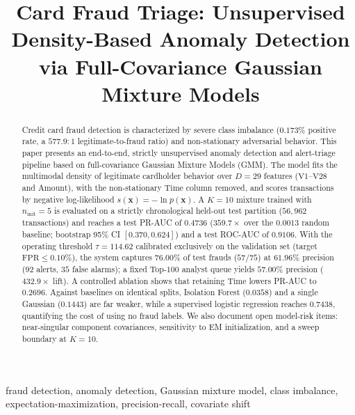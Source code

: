 \documentclass[conference]{IEEEtran}
\begin{document}
\title{Card Fraud Triage: Unsupervised Density-Based Anomaly Detection via Full-Covariance Gaussian Mixture Models}

\author{
}

\maketitle

\begin{abstract}
Credit card fraud detection is characterized by severe class imbalance ($0.173\%$ positive rate, a $577.9:1$ legitimate-to-fraud ratio) and non-stationary adversarial behavior. This paper presents an end-to-end, strictly unsupervised anomaly detection and alert-triage pipeline based on full-covariance Gaussian Mixture Models (GMM). The model fits the multimodal density of legitimate cardholder behavior over $D = 29$ features ($\text{V1}$--$\text{V28}$ and $\text{Amount}$), with the non-stationary $\text{Time}$ column removed, and scores transactions by negative log-likelihood $s(\mathbf{x}) = -\ln p(\mathbf{x})$. A $K = 10$ mixture trained with $n_{\text{init}} = 5$ is evaluated on a strictly chronological held-out test partition ($56{,}962$ transactions) and reaches a test PR-AUC of $0.4736$ ($359.7\times$ over the $0.0013$ random baseline; bootstrap 95\% CI $[0.370, 0.624]$) and a test ROC-AUC of $0.9106$. With the operating threshold $\tau = 114.62$ calibrated exclusively on the validation set (target $\text{FPR} \le 0.10\%$), the system captures $76.00\%$ of test frauds ($57/75$) at $61.96\%$ precision ($92$ alerts, $35$ false alarms); a fixed Top-$100$ analyst queue yields $57.00\%$ precision ($432.9\times$ lift). A controlled ablation shows that retaining $\text{Time}$ lowers PR-AUC to $0.2696$. Against baselines on identical splits, Isolation Forest ($0.0358$) and a single Gaussian ($0.1443$) are far weaker, while a supervised logistic regression reaches $0.7438$, quantifying the cost of using no fraud labels. We also document open model-risk items: near-singular component covariances, sensitivity to EM initialization, and a sweep boundary at $K = 10$.
\end{abstract}

\begin{IEEEkeywords}
fraud detection, anomaly detection, Gaussian mixture model, class imbalance, expectation-maximization, precision-recall, covariate shift
\end{IEEEkeywords}
\end{document}
